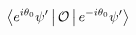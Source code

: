 \documentclass[preview]{standalone}
\begin{document}
\begin{align*}
\Braket{e^{i \theta_0}\psi ' |\mathcal{O}|e^{-i \theta_0}\psi '}
\end{align*}
\end{document}
